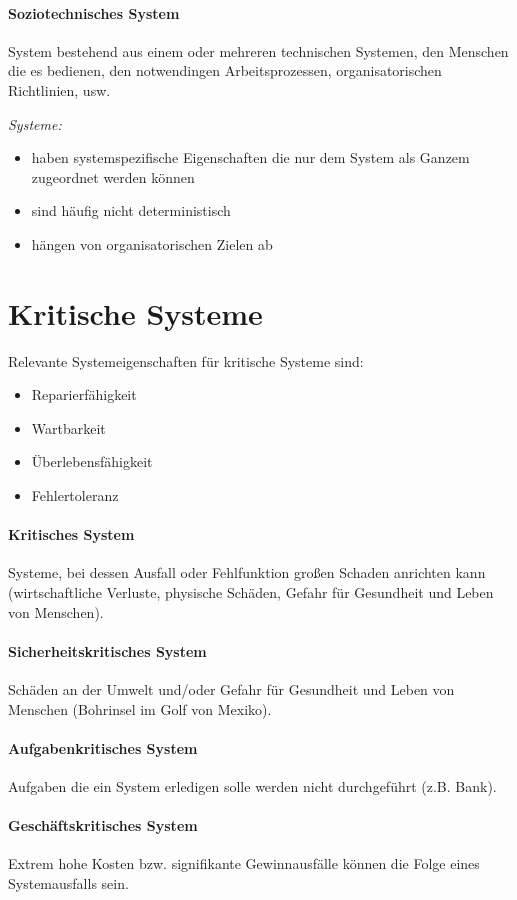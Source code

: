 \paragraph{Soziotechnisches System} System bestehend aus einem oder mehreren technischen Systemen, den Menschen die es bedienen, den notwendingen Arbeitsprozessen, organisatorischen Richtlinien, usw.

\emph{Systeme:}
\begin{itemize}
	\item haben systemspezifische Eigenschaften die nur dem System als Ganzem zugeordnet werden können
	\item sind häufig nicht deterministisch
	\item hängen von organisatorischen Zielen ab
\end{itemize}

\section{Kritische Systeme}
Relevante Systemeigenschaften für kritische Systeme sind:
\begin{itemize}
	\item Reparierfähigkeit
	\item Wartbarkeit
	\item Überlebensfähigkeit
	\item Fehlertoleranz
\end{itemize}

\paragraph{Kritisches System}
Systeme, bei dessen Ausfall oder Fehlfunktion großen Schaden anrichten kann (wirtschaftliche Verluste, physische Schäden, Gefahr für Gesundheit und Leben von Menschen).

\paragraph{Sicherheitskritisches System}
Schäden an der Umwelt und/oder Gefahr für Gesundheit und Leben von Menschen (Bohrinsel im Golf von Mexiko).

\paragraph{Aufgabenkritisches System}
Aufgaben die ein System erledigen solle werden nicht durchgeführt (z.B. Bank).

\paragraph{Geschäftskritisches System}
Extrem hohe Kosten bzw. signifikante Gewinnausfälle können die Folge eines Systemausfalls sein.





